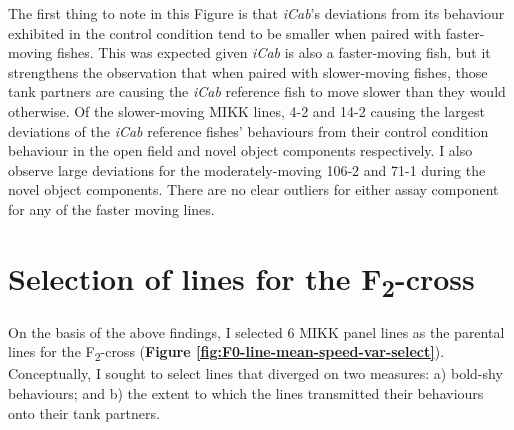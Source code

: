 \documentclass[
]{book}
\begin{document}
The first thing to note in this Figure is that \emph{\textcolor{iCab_424B4D}{iCab}}'s deviations from its behaviour exhibited in the control condition tend to be smaller when paired with faster-moving fishes. This was expected given \emph{\textcolor{iCab_424B4D}{iCab}} is also a faster-moving fish, but it strengthens the observation that when paired with slower-moving fishes, those tank partners are causing the \emph{\textcolor{iCab_424B4D}{iCab}} reference fish to move slower than they would otherwise. Of the slower-moving MIKK lines, \textcolor{4-2_FC61D4}{4-2} and \textcolor{14-2_F066EA}{14-2} causing the largest deviations of the \emph{\textcolor{iCab_424B4D}{iCab}} reference fishes' behaviours from their control condition behaviour in the open field and novel object components respectively. I also observe large deviations for the moderately-moving \textcolor{106-2_00B9E3}{106-2} and \textcolor{71-1_00BECD}{71-1} during the novel object components. There are no clear outliers for either assay component for any of the faster moving lines.

\hypertarget{selection-of-lines-for-the-f2-cross}{%
\section{\texorpdfstring{Selection of lines for the F\textsubscript{2}-cross}{Selection of lines for the F2-cross}}\label{selection-of-lines-for-the-f2-cross}}

On the basis of the above findings, I selected 6 MIKK panel lines as the parental lines for the F\textsubscript{2}-cross (\textbf{Figure \ref{fig:F0-line-mean-speed-var-select}}). Conceptually, I sought to select lines that diverged on two measures: a) bold-shy behaviours; and b) the extent to which the lines transmitted their behaviours onto their tank partners.
\end{document}
